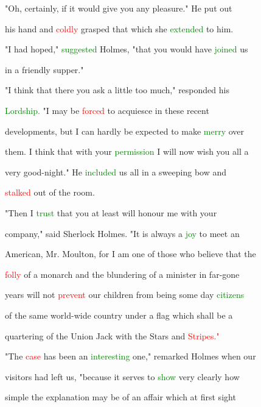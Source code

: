  "Oh, certainly, if it would give you any pleasure." He put out

 his hand and \textcolor{red}{coldly} grasped that which she \textcolor{green}{extended} to him.



 "I had hoped," \textcolor{green}{suggested} Holmes, "that you would have \textcolor{green}{joined} us

 in a \textcolor{BurntOrange}{friendly} supper."



 "I think that there you ask a little too much," responded his

 \textcolor{green}{Lordship.} "I may be \textcolor{red}{forced} to acquiesce in these recent

 developments, but I can hardly be \textcolor{BurntOrange}{expected} to make \textcolor{green}{merry} over

 them. I think that with your \textcolor{green}{permission} I will now wish you all a

 very good-night." He \textcolor{green}{included} us all in a sweeping bow and

 \textcolor{red}{stalked} out of the room.



 "Then I \textcolor{green}{trust} that you at least will honour me with your

 company," said Sherlock Holmes. "It is always a \textcolor{green}{joy} to meet an

 American, Mr. Moulton, for I am one of those who believe that the

 \textcolor{red}{folly} of a monarch and the blundering of a minister in far-gone

 years will not \textcolor{red}{prevent} our \textcolor{BurntOrange}{children} from being some day \textcolor{green}{citizens}

 of the same world-wide country under a flag which shall be a

 quartering of the Union Jack with the \textcolor{BurntOrange}{Stars} and \textcolor{red}{Stripes."}



 "The \textcolor{red}{case} has been an \textcolor{green}{interesting} one," remarked Holmes when our

 \textcolor{BurntOrange}{visitors} had left us, "because it serves to \textcolor{green}{show} very clearly how

 simple the explanation may be of an affair which at first sight

